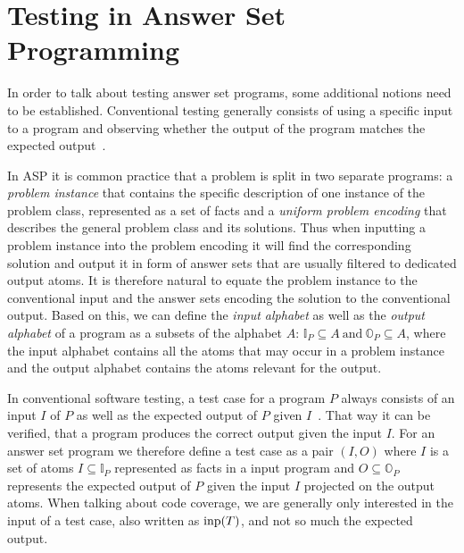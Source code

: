 \begin{comment}
- Basic introduction to asp giving all the relevant definitions (with examples + sources (for all/some?)) 
    
    -  is  Herbrand Universe/Base needed? -> not really but should it be taken out?

-> adjust these so they work for variables etc. or do this later? (is this needed?/ is it a big adjustment?)
\end{comment}

\section{Testing in Answer Set Programming}
\label{sec:Preliminaries on answer set programming/Testing in Answer Set Programming}
In order to talk about testing answer set programs, some additional notions need to be established. Conventional testing generally consists of using a specific input to a program and observing whether the output of the program matches the expected output~\cite[71\psqq]{AO16}.

In ASP it is common practice that a problem is split in two separate programs: a \emph{problem instance} that contains the specific description of one instance of the problem class, represented as a set of facts and a \emph{uniform problem encoding} that describes the general problem class and its solutions. Thus when inputting a problem instance into the problem encoding it will find the corresponding solution and output it in form of answer sets that are usually filtered to dedicated output atoms. It is therefore natural to equate the problem instance to the conventional input and the answer sets encoding the solution to the conventional output. Based on this, we can define the \emph{input alphabet} as well as the \emph{output alphabet} of a program as a subsets of the alphabet $A$: \(\mathbb{I}_P \subseteq A\ \text{and}\ \mathbb{O}_P \subseteq A\), where the input alphabet contains all the atoms that may occur in a problem instance and the output alphabet contains the atoms relevant for the output.

In conventional software testing, a test case for a program $P$ always consists of an input $I$ of $P$ as well as the expected output of $P$ given $I$~\cite{ISO29119-1}. That way it can be verified, that a program produces the correct output given the input $I$. For an answer set program we therefore define a test case as a pair \((I, O)\) where $I$ is a set of atoms \(I \subseteq \mathbb{I}_P\) represented as facts in a input program and \(O \subseteq \mathbb{O}_P\) represents the expected output of $P$ given the input $I$ projected on the output atoms. When talking about code coverage, we are generally only interested in the input of a test case, also written as \(\operatorname{inp}(T)\), and not so much the expected output.

